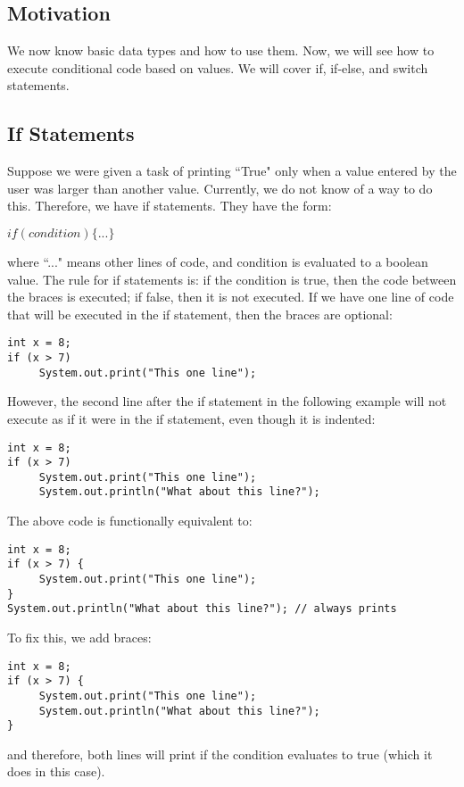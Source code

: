 

\subsection{Motivation}
We now know basic data types and how to use them. Now, we will see how to execute conditional code based on values. We will cover if, if-else, and switch statements.

\subsection{If Statements}
Suppose we were given a task of printing ``True" only when a value entered by the user was larger than another value. Currently, we do not know of a way to do this. Therefore, we have if statements. They have the form:
\begin{center}
$if(condition) \{ ... \}$
\end{center}
where ``..." means other lines of code, and condition is evaluated to a boolean value. The rule for if statements is: if the condition is true, then the code between the braces is executed; if false, then it is not executed. If we have one line of code that will be executed in the if statement, then the braces are optional:
\begin{lstlisting}
int x = 8;
if (x > 7)
     System.out.print("This one line");
\end{lstlisting}
However, the second line after the if statement in the following example will not execute as if it were in the if statement, even though it is indented:
\begin{lstlisting}
int x = 8;
if (x > 7)
     System.out.print("This one line");
     System.out.println("What about this line?");
\end{lstlisting}
The above code is functionally equivalent to:
\begin{lstlisting}
int x = 8;
if (x > 7) {
     System.out.print("This one line");
}
System.out.println("What about this line?"); // always prints
\end{lstlisting}
To fix this, we add braces:
\begin{lstlisting}
int x = 8;
if (x > 7) {
     System.out.print("This one line");
     System.out.println("What about this line?");
}
\end{lstlisting}
and therefore, both lines will print if the condition evaluates to true (which it does in this case).
\\ \\
